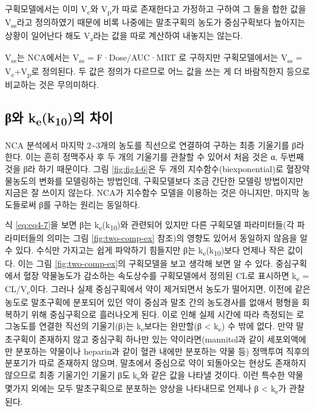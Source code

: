 \documentclass[
  11pt,
  krantz2, a4paper, twoside]{krantz}
\theoremstyle{definition}
\theoremstyle{definition}
\theoremstyle{definition}
\theoremstyle{definition}
\theoremstyle{remark}
\begin{document}
구획모델에서는 이미 V\textsubscript{c}와 V\textsubscript{p}가 따로 존재한다고 가정하고 구하여 그
둘을 합한 값을 V\textsubscript{ss}라고 정의하였기 때문에 비록 나중에는 말초구획의
농도가 중심구획보다 높아지는 상황이 일어난다 해도 V\textsubscript{z}라는 값을 따로
계산하여 내놓지는 않는다.

V\textsubscript{ss}는 NCA에서는 V\textsubscript{ss} = F·Dose/AUC·MRT 로 구하지만 구획모델에서는
V\textsubscript{ss} = V\textsubscript{c}+V\textsubscript{p}로 정의된다. 두 값은 정의가 다르므로 어느 값을 쓰는 게
더 바람직한지 등으로 비교하는 것은 무의미하다.

\hypertarget{ux3b2uxc640-kek10uxc758-uxcc28uxc774}{%
\subsection{\texorpdfstring{β와 k\textsubscript{e}(k\textsubscript{10})의 차이}{β와 ke(k10)의 차이}}\label{ux3b2uxc640-kek10uxc758-uxcc28uxc774}}

NCA 분석에서 마지막 2\textasciitilde3개의 농도를 직선으로 연결하여 구하는 최종
기울기를 β라 한다. 이는 흔히 정맥주사 후 두 개의 기울기를 관찰할 수
있어서 처음 것은 α, 두번째 것을 β라 하기 때문이다. 그림 \ref{fig:fig4-6}은 두 개의
지수함수(biexponential)로 혈장약물농도의 변화를 모델링하는 방법인데,
구획모델보다 조금 간단한 모델링 방법이지만 지금은 잘 쓰이지 않는다.
NCA가 지수함수 모델을 이용하는 것은 아니지만, 마지막 농도들로써 β를
구하는 원리는 동일하다.

식 \eqref{eq:eq4-7}을 보면 β는 k\textsubscript{e}(k\textsubscript{10})와 관련되어 있지만 다른 구획모델
파라미터들(각 파라미터들의 의미는 그림 \ref{fig:two-comp-ex} 참조)의 영향도 있어서 동일하지
않음을 알 수 있다. 수식만 가지고는 쉽게 파악하기 힘들지만 β는
k\textsubscript{e}(k\textsubscript{10})보다 언제나 작은 값이다. 이는 그림 \ref{fig:two-comp-ex}의 구획모델을 보고
생각해 보면 알 수 있다. 중심구획에서 혈장 약물농도가 감소하는
속도상수를 구획모델에서 정의된 CL로 표시하면 k\textsubscript{e} = CL/V\textsubscript{c}이다. 그러나
실제 중심구획에서 약이 제거되면서 농도가 떨어지면, 이전에 같은 농도로
말초구획에 분포되어 있던 약이 중심과 말초 간의 농도경사를 없애서 평형을
회복하기 위해 중심구획으로 흘러나오게 된다. 이로 인해 실제 시간에 따라
측정되는 로그농도를 연결한 직선의 기울기(β)는 k\textsubscript{e}보다는 완만할(β \textless{}
k\textsubscript{e}) 수 밖에 없다. 만약 말초구획이 존재하지 않고 중심구획 하나만 있는
약이라면(mannitol과 같이 세포외액에만 분포하는 약물이나 heparin과 같이
혈관 내에만 분포하는 약물 등) 정맥투여 직후의 분포기가 따로 존재하지
않으며, 말초에서 중심으로 약이 되돌아오는 현상도 존재하지 않으므로 최종
기울기인 기울기 β도 k\textsubscript{e}와 같은 값을 나타낼 것이다. 이런 특수한 약물
몇가지 외에는 모두 말초구획으로 분포하는 양상을 나타내므로 언제나 β \textless{}
k\textsubscript{e}가 관찰된다.
\end{document}
